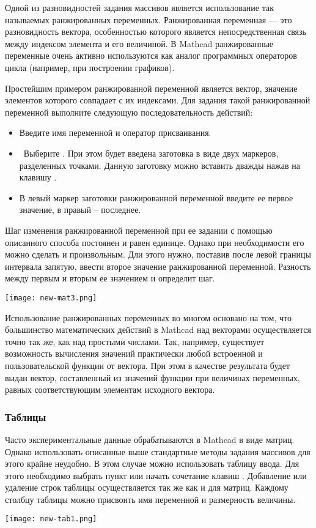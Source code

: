 
Одной из разновидностей задания массивов является использование так называемых ранжированных переменных. Ранжированная переменная --- это разновидность вектора, особенностью которого является непосредственная связь между индексом элемента и его величиной. В Mathcad ранжированные переменные очень активно используются как аналог программных операторов цикла (например, при построении графиков).

Простейшим примером ранжированной переменной является вектор, значение элементов которого совпадает с их индексами. Для задания такой ранжированной переменной выполните следующую последовательность действий:
\begin{itemize}
	\item Введите имя переменной и оператор присваивания.
	\item  Выберите  . При этом будет введена заготовка в виде двух маркеров, разделенных точками.	Данную заготовку можно вставить дважды нажав на клавишу .
	\item В левый  маркер заготовки ранжированной переменной введите ее первое значение, в правый – последнее.
\end{itemize}

Шаг изменения ранжированной переменной при ее задании с помощью описанного способа постоянен и равен единице. Однако при необходимости его можно сделать и произвольным. Дли этого нужно, поставив после левой границы интервала запятую, ввести второе значение ранжированной переменной. Разность между первым и вторым ее значением и определит шаг. 
\begin{center}
	\texttt{[image: new-mat3.png]}
\end{center}

Использование ранжированных переменных во многом основано на том, что большинство математических действий в Mathcad над векторами осуществляется точно так же, как над простыми числами. Так, например, существует возможность вычисления значений практически любой встроенной и пользовательской функции от вектора. При этом в качестве результата будет выдан вектор, составленный из значений функции при величинах переменных, равных соответствующим элементам исходного вектора.

\subsubsection*{Таблицы}
Часто экспериментальные данные обрабатываются в Mathcad в виде матриц. Однако использовать описанные выше стандартные методы задания массивов для этого крайне неудобно. В этом случае можно использовать таблицу ввода. Для этого необходимо выбрать пункт  или начать сочетание клавиш . Добавление или удаление строк таблицы осуществляется так же как и для матриц. Каждому столбцу таблицы можно присвоить имя переменной и размерность величины.
\begin{center}
	\texttt{[image: new-tab1.png]}
\end{center}


